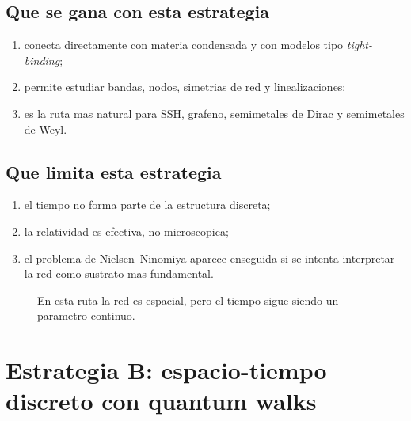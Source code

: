 \subsection{Que se gana con esta estrategia}

\begin{enumerate}[leftmargin=*]
  \item conecta directamente con materia condensada y con modelos tipo \emph{tight-binding};
  \item permite estudiar bandas, nodos, simetrias de red y linealizaciones;
  \item es la ruta mas natural para SSH, grafeno, semimetales de Dirac y semimetales de Weyl.
\end{enumerate}

\subsection{Que limita esta estrategia}

\begin{enumerate}[leftmargin=*]
  \item el tiempo no forma parte de la estructura discreta;
  \item la relatividad es efectiva, no microscopica;
  \item el problema de Nielsen--Ninomiya aparece enseguida si se intenta interpretar la red como sustrato mas fundamental.
\end{enumerate}

\begin{figure}[ht]
\centering
{}
\caption{En esta ruta la red es espacial, pero el tiempo sigue siendo un parametro continuo.}
\label{c21:fig:continuous-time-picture}
\end{figure}

\section{Estrategia B: espacio-tiempo discreto con quantum walks}


